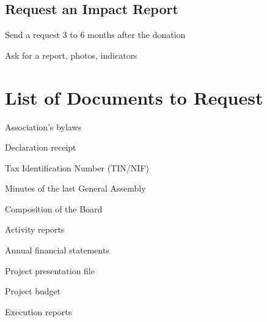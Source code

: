 \documentclass[12pt, a4paper]{article}
\begin{document}
\subsection{Request an Impact Report}
\begin{arrowlist}
    \item Send a request 3 to 6 months after the donation
    \item Ask for a report, photos, indicators
\end{arrowlist}

\newpage

\section{List of Documents to Request}

\begin{tcolorbox}[colback=darkgreen!5!white, colframe=darkgreen!75!black, title=\textbf{Category 1: Proof of Legal Existence}]
\begin{starredlist}
    \item Association's bylaws
    \item Declaration receipt
    \item Tax Identification Number (TIN/NIF)
\end{starredlist}
\end{tcolorbox}

\begin{tcolorbox}[colback=blue!5!white, colframe=blue!75!black, title=\textbf{Category 2: Governance and Transparency}]
\begin{starredlist}
    \item Minutes of the last General Assembly
    \item Composition of the Board
    \item Activity reports
    \item Annual financial statements
\end{starredlist}
\end{tcolorbox}

\begin{tcolorbox}[colback=orange!5!white, colframe=orange!75!black, title=\textbf{Category 3: Project Documents}]
\begin{starredlist}
    \item Project presentation file
    \item Project budget
    \item Execution reports
\end{starredlist}
\end{tcolorbox}
\end{document}
